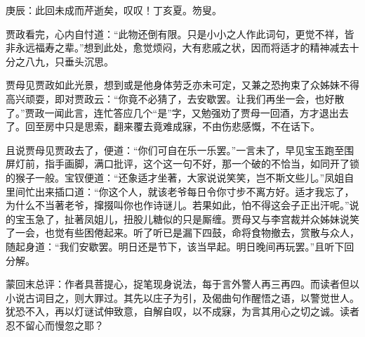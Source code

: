 \begin{parag}
    \begin{note}庚辰：此回未成而芹逝矣，叹叹！丁亥夏。笏叟。\end{note}
\end{parag}


\begin{parag}
    贾政看完，心内自忖道：“此物还倒有限。只是小小之人作此词句，更觉不祥，皆非永远福寿之辈。”想到此处，愈觉烦闷，大有悲戚之状，因而将适才的精神减去十分之八九，只垂头沉思。
\end{parag}


\begin{parag}
    贾母见贾政如此光景，想到或是他身体劳乏亦未可定，又兼之恐拘束了众姊妹不得高兴顽耍，即对贾政云：“你竟不必猜了，去安歇罢。让我们再坐一会，也好散了。”贾政一闻此言，连忙答应几个“是”字，又勉强劝了贾母一回酒，方才退出去了。回至房中只是思索，翻来覆去竟难成寐，不由伤悲感慨，不在话下。
\end{parag}


\begin{parag}
    且说贾母见贾政去了，便道：“你们可自在乐一乐罢。”一言未了，早见宝玉跑至围屏灯前，指手画脚，满口批评，这个这一句不好，那一个破的不恰当，如同开了锁的猴子一般。宝钗便道：“还象适才坐著，大家说说笑笑，岂不斯文些儿。”凤姐自里间忙出来插口道：“你这个人，就该老爷每日令你寸步不离方好。适才我忘了，为什么不当著老爷，撺掇叫你也作诗谜儿。若果如此，怕不得这会子正出汗呢。”说的宝玉急了，扯著凤姐儿，扭股儿糖似的只是厮缠。贾母又与李宫裁并众姊妹说笑了一会，也觉有些困倦起来。听了听已是漏下四鼓，命将食物撤去，赏散与众人，随起身道：“我们安歇罢。明日还是节下，该当早起。明日晚间再玩罢。”且听下回分解。
\end{parag}


\begin{parag}
    \begin{note}蒙回末总评：作者具菩提心，捉笔现身说法，每于言外警人再三再四。而读者但以小说古词目之，则大罪过。其先以庄子为引，及偈曲句作醒悟之语，以警觉世人。犹恐不入，再以灯谜试伸致意，自解自叹，以不成寐，为言其用心之切之诚。读者忍不留心而慢忽之耶？\end{note}
\end{parag}

